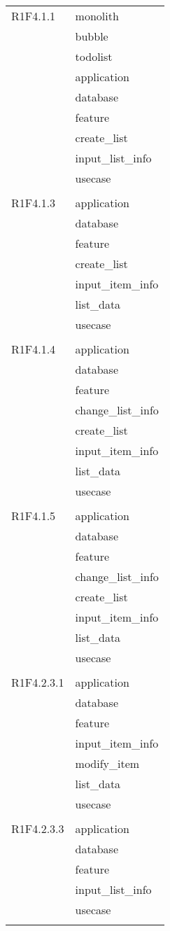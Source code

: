 \begin{center}
\begin{longtable}{|p{7cm}|p{7cm}|}
		R1F4.1.1 & monolith \\ & bubble \\ & todolist \\ & application \\ & database \\ & feature \\ & create\_list \\ & input\_list\_info \\ & usecase \\ & \\ \hline
		R1F4.1.3 & application \\ & database \\ & feature \\ & create\_list \\ & input\_item\_info \\ & list\_data \\ & usecase \\ & \\ \hline
		R1F4.1.4 & application \\ & database \\ & feature \\ & change\_list\_info \\ & create\_list \\ & input\_item\_info \\ & list\_data \\ & usecase \\ & \\ \hline
		R1F4.1.5 & application \\ & database \\ & feature \\ & change\_list\_info \\ & create\_list \\ & input\_item\_info \\ & list\_data \\ & usecase \\ & \\ \hline
		R1F4.2.3.1 & application \\ & database \\ & feature \\ & input\_item\_info \\ & modify\_item \\ & list\_data \\ & usecase \\ & \\ \hline
		R1F4.2.3.3 & application \\ & database \\ & feature \\ & input\_list\_info \\ & usecase \\ & \\ \hline

\end{longtable}
\end{center}
